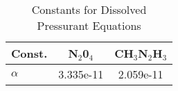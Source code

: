 \begin{table} \centering
\caption{Constants for Dissolved Pressurant Equations}
\begin{tabular}{lcc}
  \hline
  Const. & \mbox{N}$_2$\mbox{0}$_4$ & CH$_3$N$_2$H$_3$ \\
  \hline \hline
  $\alpha$ & 3.335e-11 & 2.059e-11 \\
  \hline
\end{tabular}
\end{table}
